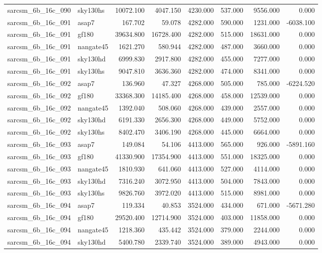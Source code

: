 \begin{tabular}{llrrrrrr}
sarcsm\_6b\_16c\_090 & sky130hs & 10072.100 & 4047.150 & 4230.000 & 537.000 & 9556.000 & 0.000 \\
sarcsm\_6b\_16c\_091 & asap7 & 167.702 & 59.078 & 4282.000 & 590.000 & 1231.000 & -6038.100 \\
sarcsm\_6b\_16c\_091 & gf180 & 39634.800 & 16728.400 & 4282.000 & 515.000 & 18631.000 & 0.000 \\
sarcsm\_6b\_16c\_091 & nangate45 & 1621.270 & 580.944 & 4282.000 & 487.000 & 3660.000 & 0.000 \\
sarcsm\_6b\_16c\_091 & sky130hd & 6999.830 & 2917.800 & 4282.000 & 455.000 & 7277.000 & 0.000 \\
sarcsm\_6b\_16c\_091 & sky130hs & 9047.810 & 3636.360 & 4282.000 & 474.000 & 8341.000 & 0.000 \\
sarcsm\_6b\_16c\_092 & asap7 & 136.960 & 47.327 & 4268.000 & 505.000 & 785.000 & -6224.520 \\
sarcsm\_6b\_16c\_092 & gf180 & 33368.300 & 14185.400 & 4268.000 & 458.000 & 12539.000 & 0.000 \\
sarcsm\_6b\_16c\_092 & nangate45 & 1392.040 & 508.060 & 4268.000 & 439.000 & 2557.000 & 0.000 \\
sarcsm\_6b\_16c\_092 & sky130hd & 6191.330 & 2656.300 & 4268.000 & 449.000 & 5752.000 & 0.000 \\
sarcsm\_6b\_16c\_092 & sky130hs & 8402.470 & 3406.190 & 4268.000 & 445.000 & 6664.000 & 0.000 \\
sarcsm\_6b\_16c\_093 & asap7 & 149.084 & 54.106 & 4413.000 & 565.000 & 926.000 & -5891.160 \\
sarcsm\_6b\_16c\_093 & gf180 & 41330.900 & 17354.900 & 4413.000 & 551.000 & 18325.000 & 0.000 \\
sarcsm\_6b\_16c\_093 & nangate45 & 1810.930 & 641.060 & 4413.000 & 527.000 & 4114.000 & 0.000 \\
sarcsm\_6b\_16c\_093 & sky130hd & 7316.240 & 3072.950 & 4413.000 & 504.000 & 7843.000 & 0.000 \\
sarcsm\_6b\_16c\_093 & sky130hs & 9826.760 & 3972.020 & 4413.000 & 515.000 & 8981.000 & 0.000 \\
sarcsm\_6b\_16c\_094 & asap7 & 119.334 & 40.853 & 3524.000 & 434.000 & 671.000 & -5671.280 \\
sarcsm\_6b\_16c\_094 & gf180 & 29520.400 & 12714.900 & 3524.000 & 403.000 & 11858.000 & 0.000 \\
sarcsm\_6b\_16c\_094 & nangate45 & 1218.360 & 435.442 & 3524.000 & 379.000 & 2244.000 & 0.000 \\
sarcsm\_6b\_16c\_094 & sky130hd & 5400.780 & 2339.740 & 3524.000 & 389.000 & 4943.000 & 0.000 \\

\end{tabular}
